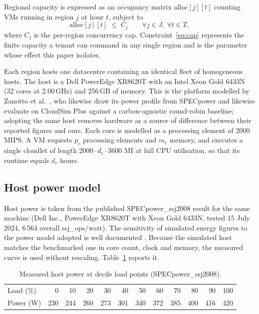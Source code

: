 Regional capacity is expressed as an occupancy matrix
$\mathrm{alloc}[j][t]$ counting VMs running in region $j$ at hour $t$, subject
to
%
\begin{equation}
\mathrm{alloc}[j][t] \;\le\; C_j
\qquad \forall j \in J,\; \forall t \in T ,
\label{eq:cap}
\end{equation}
%
where $C_j$ is the per-region concurrency cap. Constraint~\eqref{eq:cap}
represents the finite capacity a tenant can command in any single region and is
the parameter whose effect this paper isolates.

Each region hosts one datacentre containing an identical fleet of homogeneous
hosts. The host is a Dell PowerEdge XR8620T with an Intel Xeon Gold 6433N
(32 cores at 2.00\,GHz) and 256\,GB of memory. This is the platform modelled by
Zanotto et al.~\cite{zanotto2025usercentric}, who likewise draw its power profile from SPECpower and likewise
evaluate on CloudSim Plus against a carbon-agnostic round-robin baseline;
adopting the same host removes hardware as a source of difference between their
reported figures and ours. Each core is modelled as a processing element of
2000\,MIPS.
A VM requests $p_r$ processing elements and $m_r$ memory, and executes a single
cloudlet of length $2000 \cdot d_r \cdot 3600$ MI at full CPU utilisation, so
that its runtime equals $d_r$ hours.

\subsection{Host power model}
\label{sec:power}

Host power is taken from the published SPECpower\_ssj2008 result for the same
machine \cite{spec2024xr8620t} (Dell Inc., PowerEdge XR8620T with Xeon Gold 6433N,
tested 15 July 2024, 6\,564 overall ssj\_ops/watt). The sensitivity of simulated
energy figures to the power model adopted is well documented
\cite{ismail2020serverpower}. Because the simulated host matches the
benchmarked one in core count, clock and memory, the measured curve is used
without rescaling. Table~\ref{tab:power} reports it.

\begin{table}[t]
\centering
\caption{Measured host power at decile load points (SPECpower\_ssj2008).}
\label{tab:power}
\begin{tabular}{lrrrrrrrrrrr}
\toprule
Load (\%) & 0 & 10 & 20 & 30 & 40 & 50 & 60 & 70 & 80 & 90 & 100 \\
Power (W) & 230 & 244 & 260 & 273 & 301 & 340 & 372 & 385 & 400 & 416 & 420 \\
\bottomrule
\end{tabular}
\end{table}


